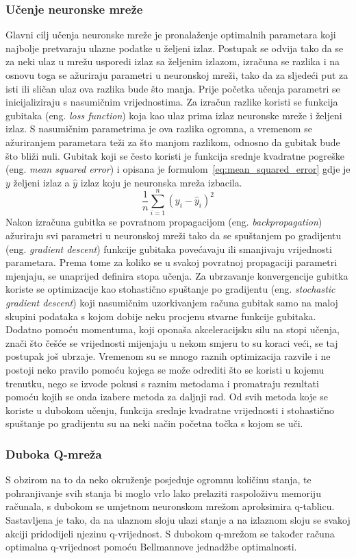 \subsubsection{Učenje neuronske mreže}
Glavni cilj učenja neuronske mreže je pronalaženje optimalnih parametara koji najbolje pretvaraju ulazne podatke u željeni izlaz. Postupak se odvija tako da se za neki ulaz u mrežu usporedi izlaz sa željenim izlazom, izračuna se razlika i na osnovu toga se ažuriraju parametri u neuronskoj mreži, tako da za sljedeći put za isti ili sličan ulaz ova razlika bude što manja. Prije početka učenja parametri se inicijaliziraju s nasumičnim vrijednostima. Za izračun razlike koristi se funkcija gubitaka (eng. \textit{loss function}) koja kao ulaz prima izlaz neuronske mreže i željeni izlaz. S nasumičnim parametrima je ova razlika ogromna, a vremenom se ažuriranjem parametara teži za što manjom razlikom, odnosno da gubitak bude što bliži nuli. Gubitak koji se često koristi je funkcija srednje kvadratne pogreške (eng. \textit{mean squared error}) i opisana je formulom~\ref{eq:mean_squared_error} gdje je $y$ željeni izlaz a $\hat{y}$ izlaz koju je neuronska mreža izbacila. 
\begin{equation}\label{eq:mean_squared_error}
\frac{1}{n}\sum_{i=1}^{n}(y_i - \hat{y}_i)^2
\end{equation}
Nakon izračuna gubitka se povratnom propagacijom (eng. \textit{backpropagation}) ažuriraju svi parametri u neuronskoj mreži tako da se spuštanjem po gradijentu (eng. \textit{gradient descent}) funkcije gubitaka povećavaju ili smanjivaju vrijednosti parametara. Prema tome za koliko se u svakoj povratnoj propagaciji parametri mjenjaju, se unaprijed definira stopa učenja. Za ubrzavanje konvergencije gubitka koriste se optimizacije kao stohastično spuštanje po gradijentu (eng. \textit{stochastic gradient descent}) koji nasumičnim uzorkivanjem računa gubitak samo na maloj skupini podataka s kojom dobije neku procjenu stvarne funkcije gubitaka. Dodatno pomoću momentuma, koji oponaša akceleracijsku silu na stopi učenja, znači što češće se vrijednosti mijenjaju u nekom smjeru to su koraci veći, se taj postupak još ubrzaje. Vremenom su se mnogo raznih optimizacija razvile i ne postoji neko pravilo pomoću kojega se može odrediti što se koristi u kojemu trenutku, nego se izvode pokusi s raznim metodama i promatraju rezultati pomoću kojih se onda izabere metoda za daljnji rad. Od svih metoda koje se koriste u dubokom učenju, funkcija srednje kvadratne vrijednosti i stohastično spuštanje po gradijentu su na neki način početna točka s kojom se uči.

\subsubsection{Duboka Q-mreža}
S obzirom na to da neko okruženje posjeduje ogromnu količinu stanja, te pohranjivanje svih stanja bi moglo vrlo lako prelaziti raspoloživu memoriju računala, s dubokom se umjetnom neuronskom mrežom aproksimira q-tablicu. Sastavljena je tako, da na ulaznom sloju ulazi stanje a na izlaznom sloju se svakoj akciji pridodijeli njezinu q-vrijednost. S dubokom q-mrežom se također računa optimalna q-vrijednost pomoću Bellmannove jednadžbe optimalnosti.
